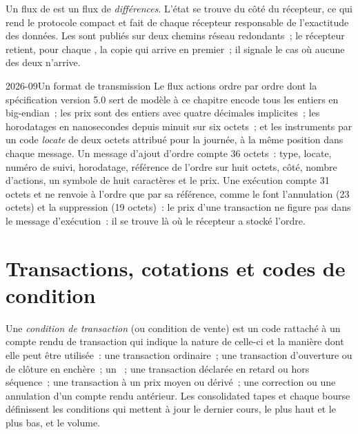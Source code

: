 Un flux de  est un flux de \emph{différences}. L'état se trouve du
côté du récepteur, ce qui rend le protocole compact et fait de chaque récepteur
responsable de l'exactitude des données. Les  sont publiés sur deux
chemins réseau redondants~; le récepteur retient, pour chaque , la copie
qui arrive en premier~; il signale le cas où aucune des deux n'arrive.

\begin{dated}{2026-09}{Un format de transmission}\label{dat:m1:reading-market-data:itch}
Le flux actions ordre par ordre dont la spécification version 5.0 sert de
modèle à ce chapitre encode tous les entiers en big-endian~; les prix sont des entiers
avec quatre décimales implicites~; les horodatages en nanosecondes depuis minuit
sur six octets~; et les instruments par un code \emph{locate} de deux octets attribué pour
la journée, à la même position dans chaque message. Un message d'ajout d'ordre compte 36
octets~: type, locate, numéro de suivi, horodatage, référence de l'ordre sur huit
octets, côté, nombre d'actions, un symbole de huit caractères et le prix.
Une exécution compte 31 octets et ne renvoie à l'ordre que par sa référence, comme le font
l'annulation (23 octets) et la suppression (19 octets)~: le prix d'une transaction ne figure pas
dans le message d'exécution~: il se trouve là où le récepteur a stocké l'ordre.
\end{dated}

\section{Transactions, cotations et codes de condition}

\begin{definition}\label{def:m1:reading-market-data:condition}
Une \emph{condition de transaction} (ou condition de vente) est un code
rattaché à un compte rendu de transaction qui indique la nature de celle-ci et la manière dont elle
peut être utilisée~: une transaction ordinaire~; une transaction d'ouverture ou de clôture en enchère~; un ~; une transaction déclarée en retard ou hors séquence~; une transaction à un prix
moyen ou dérivé~; une correction ou une annulation d'un compte rendu antérieur. Les
consolidated tapes et chaque bourse définissent les conditions qui mettent à jour le dernier
cours, le plus haut et le plus bas, et le volume.
\end{definition}

